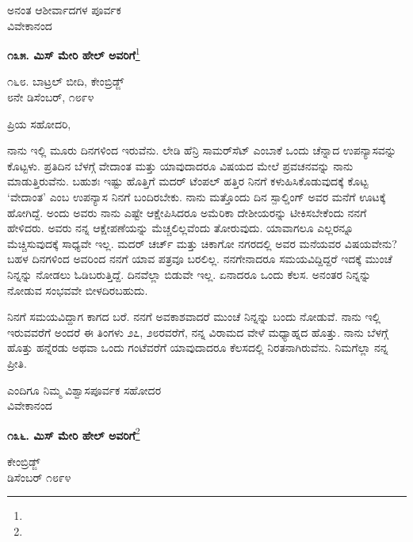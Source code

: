 {\flushright
ಅನಂತ ಆಶೀರ್ವಾದಗಳ ಪೂರ್ವಕ\\ವಿವೇಕಾನಂದ\par}

\begin{center}
\textbf{೧೩೫. ಮಿಸ್ ಮೇರಿ ಹೇಲ್ ಅವರಿಗೆ}\footnote{}
\end{center}

\begin{flushright}
೧೬೮. ಬಾಟ್ರಲ್ ಬೀದಿ, ಕೇಂಬ್ರಿಡ್ಜ್\\೮ನೇ ಡಿಸೆಂಬರ್, ೧೮೯೪
\end{flushright}

\noindent
ಪ್ರಿಯ ಸಹೋದರಿ,

ನಾನು ಇಲ್ಲಿ ಮೂರು ದಿನಗಳಿಂದ ಇರುವೆನು. ಲೇಡಿ ಹೆನ್ರಿ ಸಾಮರ್‌ಸೆಟ್\enginline{-} ಎಂಬಾಕೆ ಒಂದು ಚೆನ್ನಾದ ಉಪನ್ಯಾಸವನ್ನು ಕೊಟ್ಟಳು. ಪ್ರತಿದಿನ ಬೆಳಗ್ಗೆ ವೇದಾಂತ ಮತ್ತು ಯಾವುದಾದರೂ ವಿಷಯದ ಮೇಲೆ ಪ್ರವಚನವನ್ನು ನಾನು ಮಾಡುತ್ತಿರುವೆನು. ಬಹುಶಃ ಇಷ್ಟು ಹೊತ್ತಿಗೆ ಮದರ್ ಟೆಂಪಲ್ ಹತ್ತಿರ ನಿನಗೆ ಕಳುಹಿಸಿಕೊಡುವುದಕ್ಕೆ ಕೊಟ್ಟ ‘ವೇದಾಂತ’ ಎಂಬ ಉಪನ್ಯಾಸ ನಿನಗೆ ಬಂದಿರಬೇಕು. ನಾನು ಮತ್ತೊಂದು ದಿನ ಸ್ಪಾಲ್ಡಿಂಗ್ ಅವರ ಮನೆಗೆ ಊಟಕ್ಕೆ ಹೋಗಿದ್ದೆ. ಅಂದು ಅವರು ನಾನು ಎಷ್ಟೇ ಆಕ್ಷೇಪಿಸಿದರೂ ಅಮೆರಿಕಾ ದೇಶೀಯರನ್ನು ಟೀಕಿಸಬೇಕೆಂದು ನನಗೆ ಹೇಳಿದರು. ಅವರು ನನ್ನ ಆಕ್ಷೇಪಣೆಯನ್ನು ಮೆಚ್ಚಲಿಲ್ಲವೆಂದು ತೋರುವುದು. ಯಾವಾಗಲೂ ಎಲ್ಲರನ್ನೂ ಮೆಚ್ಚಿಸುವುದಕ್ಕೆ ಸಾಧ್ಯವೇ ಇಲ್ಲ. ಮದರ್ ಚರ್ಚ್ ಮತ್ತು ಚಿಕಾಗೋ ನಗರದಲ್ಲಿ ಅವರ ಮನೆಯವರ ವಿಷಯವೇನು? ಬಹಳ ದಿನಗಳಿಂದ ಅವರಿಂದ ನನಗೆ ಯಾವ ಪತ್ರವೂ ಬರಲಿಲ್ಲ. ನನಗೇನಾದರೂ ಸಮಯವಿದ್ದಿದ್ದರೆ ಇದಕ್ಕೆ ಮುಂಚೆ ನಿನ್ನನ್ನು ನೋಡಲು ಓಡಿಬರುತ್ತಿದ್ದೆ. ದಿನವೆಲ್ಲಾ ಬಿಡುವೇ ಇಲ್ಲ. ಏನಾದರೂ ಒಂದು ಕೆಲಸ. ಅನಂತರ ನಿನ್ನನ್ನು ನೋಡುವ ಸಂಭವವೇ ಬೀಳದಿರಬಹುದು.

ನಿನಗೆ ಸಮಯವಿದ್ದಾಗ ಕಾಗದ ಬರೆ. ನನಗೆ ಅವಕಾಶವಾದರೆ ಮುಂಚೆ ನಿನ್ನನ್ನು ಬಂದು ನೋಡುವೆ. ನಾನು ಇಲ್ಲಿ ಇರುವವರೆಗೆ ಅಂದರೆ ಈ ತಿಂಗಳು ೨೭, ೨೮ರವರೆಗೆ, ನನ್ನ ವಿರಾಮದ ವೇಳೆ ಮಧ್ಯಾಹ್ನದ ಹೊತ್ತು. ನಾನು ಬೆಳಗ್ಗೆ ಹೊತ್ತು ಹನ್ನೆರಡು ಅಥವಾ ಒಂದು ಗಂಟೆವರೆಗೆ ಯಾವುದಾದರೂ ಕೆಲಸದಲ್ಲಿ ನಿರತನಾಗಿರುವೆನು. ನಿಮಗೆಲ್ಲಾ ನನ್ನ ಪ್ರೀತಿ.

{\flushright
ಎಂದಿಗೂ ನಿಮ್ಮ ವಿಶ್ವಾಸಪೂರ್ವಕ ಸಹೋದರ\\ವಿವೇಕಾನಂದ\par}

\begin{center}
\textbf{೧೩೬. ಮಿಸ್ ಮೇರಿ ಹೇಲ್‌ ಅವರಿಗೆ}\footnote{}
\end{center}

\vspace{-0.7cm}

\begin{flushright}
ಕೇಂಬ್ರಿಡ್ಜ್\\ಡಿಸೆಂಬರ್ ೧೮೯೪
\end{flushright}

\vspace{-0.6cm}

